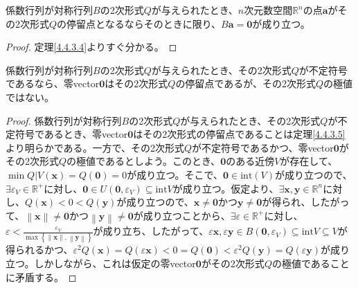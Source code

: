 \documentclass[dvipdfmx]{jsarticle}
\begin{document}
\begin{thm}\label{4.4.3.5}
係数行列が対称行列$B$の2次形式$Q$が与えられたとき、$n$次元数空間$\mathbb{R}^{n}$の点$\mathbf{a}$がその2次形式$Q$の停留点となるならそのときに限り、$B\mathbf{a} = \mathbf{0}$が成り立つ。
\end{thm}
\begin{proof} 定理\ref{4.4.3.4}よりすぐ分かる。
\end{proof}
\begin{thm}\label{4.4.3.6}
係数行列が対称行列$B$の2次形式$Q$が与えられたとき、その2次形式$Q$が不定符号であるなら、零vector$\mathbf{0}$はその2次形式$Q$の停留点であるが、その2次形式$Q$の極値ではない。
\end{thm}
\begin{proof}
係数行列が対称行列$B$の2次形式$Q$が与えられたとき、その2次形式$Q$が不定符号であるとき、零vector$\mathbf{0}$はその2次形式の停留点であることは定理\ref{4.4.3.5}より明らかである。一方で、その2次形式$Q$が不定符号であるかつ、零vector$\mathbf{0}$がその2次形式$Q$の極値であるとしよう。このとき、$\mathbf{0}$のある近傍$V$が存在して、$\min{Q|V\left( \mathbf{x} \right)} = Q\left( \mathbf{0} \right) = 0$が成り立つ。そこで、$\mathbf{0} \in \mathrm{int}(V)$が成り立つので、$\exists\varepsilon_{V} \in \mathbb{R}^{+}$に対し、$\mathbf{0} \in U\left( \mathbf{0},\varepsilon_{V} \right) \subseteq \mathrm{int}V$が成り立つ。仮定より、$\exists\mathbf{x},\mathbf{y} \in \mathbb{R}^{n}$に対し、$Q\left( \mathbf{x} \right) < 0 < Q\left( \mathbf{y} \right)$が成り立つので、$\mathbf{x} \neq \mathbf{0}$かつ$\mathbf{y} \neq \mathbf{0}$が得られ、したがって、$\left\| \mathbf{x} \right\| \neq \mathbf{0}$かつ$\left\| \mathbf{y} \right\| \neq \mathbf{0}$が成り立つことから、$\exists\varepsilon \in \mathbb{R}^{+}$に対し、$\varepsilon < \frac{\varepsilon_{V}}{\max\left\{ \left\| \mathbf{x} \right\|,\left\| \mathbf{y} \right\| \right\}}$が成り立ち、したがって、$\varepsilon\mathbf{x},\varepsilon\mathbf{y} \in B\left( \mathbf{0},\varepsilon_{V} \right) \subseteq \mathrm{int}V \subseteq V$が得られるかつ、$\varepsilon^{2}Q\left( \mathbf{x} \right) = Q\left( \varepsilon\mathbf{x} \right) < 0 = Q\left( \mathbf{0} \right) < \varepsilon^{2}Q\left( \mathbf{y} \right) = Q\left( \varepsilon\mathbf{y} \right)$が成り立つ。しかしながら、これは仮定の零vector$\mathbf{0}$がその2次形式$Q$の極値であることに矛盾する。
\end{proof}
\end{document}
